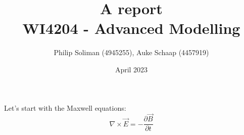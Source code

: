 \documentclass[11pt]{article}
\title{%
    A report \\
    \large WI4204 - Advanced Modelling
}
\author{Philip Soliman (4945255), Auke Schaap (4457919)}
\date{April 2023}
\begin{document}
\maketitle

Let's start with the Maxwell equations:
\begin{equation}
    \nabla \times \vec{E} = -\frac{\partial \vec{B}}{\partial t}
\end{equation}
\end{document}
